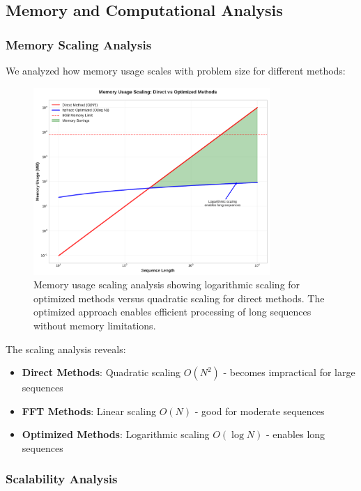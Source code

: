 \subsection{Memory and Computational Analysis}

\subsubsection{Memory Scaling Analysis}

We analyzed how memory usage scales with problem size for different methods:

\begin{figure}[h]
\centering
\includegraphics[width=0.8\textwidth]{../figures/memory_scaling.pdf}
\caption{Memory usage scaling analysis showing logarithmic scaling for optimized \hpfracc methods versus quadratic scaling for direct methods. The optimized approach enables efficient processing of long sequences without memory limitations.}
\label{fig:memory_scaling}
\end{figure}

The scaling analysis reveals:
\begin{itemize}
    \item \textbf{Direct Methods}: Quadratic scaling $O(N^2)$ - becomes impractical for large sequences
    \item \textbf{FFT Methods}: Linear scaling $O(N)$ - good for moderate sequences
    \item \textbf{Optimized Methods}: Logarithmic scaling $O(\log N)$ - enables long sequences
\end{itemize}

\subsubsection{Scalability Analysis}

